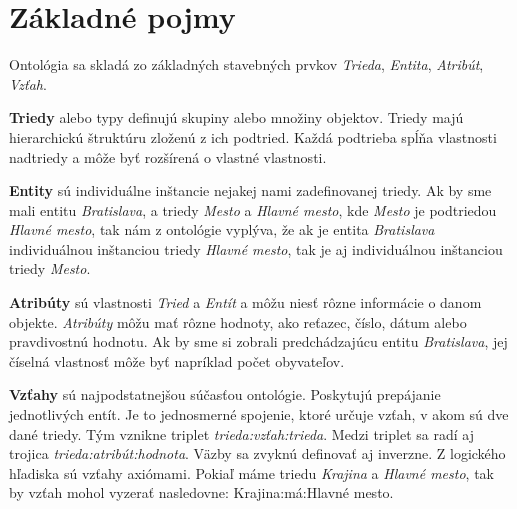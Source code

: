 \documentclass[12pt, a4paper, oneside]{book}
\begin{document}

\section{Základné pojmy}
Ontológia sa skladá zo základných stavebných prvkov \textit{Trieda}, \textit{Entita}, \textit{Atribút}, \textit{Vzťah}. 


\textbf{Triedy} alebo typy definujú skupiny alebo množiny objektov. Triedy majú hierarchickú štruktúru zloženú z ich podtried. Každá podtrieba spĺňa vlastnosti nadtriedy a môže byť rozšírená o vlastné vlastnosti.


\textbf{Entity} sú individuálne inštancie nejakej nami zadefinovanej triedy. Ak by sme mali entitu \textit{Bratislava}, a triedy \textit{Mesto} a \textit{Hlavné mesto}, kde \textit{Mesto} je podtriedou \textit{Hlavné mesto}, tak nám z ontológie vyplýva, že ak je entita \textit{Bratislava} individuálnou inštanciou triedy \textit{Hlavné mesto}, tak je aj individuálnou inštanciou triedy \textit{Mesto}.



\textbf{Atribúty} sú vlastnosti \textit{Tried} a \textit{Entít} a môžu niesť rôzne informácie o danom objekte. \textit{Atribúty} môžu mať rôzne hodnoty, ako reťazec, číslo, dátum alebo pravdivostnú hodnotu. Ak by sme si zobrali predchádzajúcu entitu \textit{Bratislava}, jej číselná vlastnosť môže byť napríklad počet obyvateľov.


\textbf{Vzťahy} sú najpodstatnejšou súčasťou ontológie. Poskytujú prepájanie jednotlivých entít. Je to jednosmerné spojenie, ktoré určuje vzťah, v akom sú dve dané triedy. Tým vznikne triplet \textit{trieda:vzťah:trieda}. Medzi triplet sa radí aj trojica \textit{trieda:atribút:hodnota}. Väzby sa zvyknú definovať aj inverzne. Z logického hľadiska sú vzťahy axiómami. Pokiaľ máme triedu \textit{Krajina} a \textit{Hlavné mesto}, tak by vzťah mohol vyzerať nasledovne: Krajina:má:Hlavné mesto.
\end{document}
